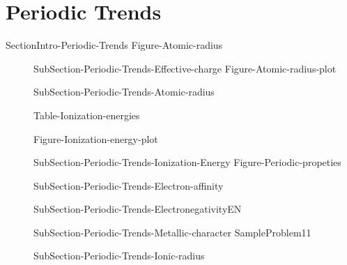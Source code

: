\documentclass[main.tex]{subfiles}
\begin{document}
{\newpage
\section{Periodic Trends}{SectionIntro-Periodic-Trends}
{Figure-Atomic-radius}
\sloppy\begin{description}
\item[] {SubSection-Periodic-Trends-Effective-charge}
{Figure-Atomic-radius-plot}
\item[] {SubSection-Periodic-Trends-Atomic-radius}
 
\newpage \checkoddpage\ifoddpage \hspace{10cm} \else  \fi

{Table-Ionization-energies}

{Figure-Ionization-energy-plot}
\item[] {SubSection-Periodic-Trends-Ionization-Energy}
{Figure-Periodic-propeties}
\item[] {SubSection-Periodic-Trends-Electron-affinity}
\item[] {SubSection-Periodic-Trends-ElectronegativityEN}
\item[]{SubSection-Periodic-Trends-Metallic-character}
{SampleProblem11}
\item[]  {SubSection-Periodic-Trends-Ionic-radius}
\end{description}



\renewcommand\chapterlabel{Ch-Table}
}{}






 \checkoddpage\ifoddpage \clearpage\thispagestyle{empty}\mbox{}\clearpage \else  \fi 
\end{document}
